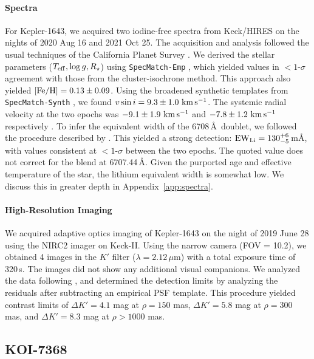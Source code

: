 \documentclass[12pt,twocolumn]{aastex63}
\newcommand{\mkms}{{\rm \,km\,s^{-1}}}  %
\begin{document}
\paragraph{Spectra}
For Kepler-1643, we acquired two iodine-free spectra from Keck/HIRES
on the nights of 2020 Aug 16 and 2021 Oct 25.  The acquisition and
analysis followed the usual techniques of the California Planet Survey
\citep{howard_cps_2010}.  We derived the stellar parameters ($T_{\rm
eff}, \log g, R_\star$) using \texttt{SpecMatch-Emp}
\citep{yee_SM_2017}, which yielded values in $<$$1$-$\sigma$ agreement
with those from the cluster-isochrone method.  This approach also
yielded $[{\rm Fe/H}]=0.13 \pm 0.09$.  Using the broadened synthetic
templates from \texttt{SpecMatch-Synth} \citep{petigura_cksi_2017}, we
found $v\sin i = 9.3 \pm 1.0\,\mkms$.  The systemic radial velocity at
the two epochs was $-9.1 \pm 1.9\,\mkms$ and $-7.8\pm 1.2\,\mkms$
respectively \citep{chubak_2012}.  To infer the equivalent width of
the  6708\,\AA\ doublet, we followed the procedure
described by \citet{bouma_2021_ngc2516}.  This yielded a strong
detection: ${\rm EW}_{\rm Li} = 130^{+6}_{-5}$\,m\AA, with values
consistent at $<$$1$-$\sigma$ between the two epochs.   The quoted
value does not correct for the  blend at 6707.44\,\AA.  Given the purported age and
effective temperature of the star, the lithium equivalent width is
somewhat low.  We discuss this in greater depth in
Appendix~\ref{app:spectra}.

\paragraph{High-Resolution Imaging}
We acquired adaptive optics imaging of Kepler-1643 on the night of
2019 June 28 using the NIRC2 imager on Keck-II.  Using the narrow
camera (FOV = 10.2\arcsec), we obtained 4 images in the $K'$ filter
($\lambda = 2.12\,\mu$m) with a total exposure time of 320\,s. 
The images did not show any additional visual companions.
We analyzed the data following \citet{kraus_impact_2016}, and
determined the detection limits by analyzing the residuals after
subtracting an empirical PSF template.  This procedure yielded
contrast limits of $\Delta K' = 4.1$ mag at $\rho = 150$ mas, $\Delta
K' = 5.8$ mag at $\rho = 300$ mas, and $\Delta K' = 8.3$ mag
at $\rho > 1000$ mas.


\subsection{KOI-7368}
\end{document}
